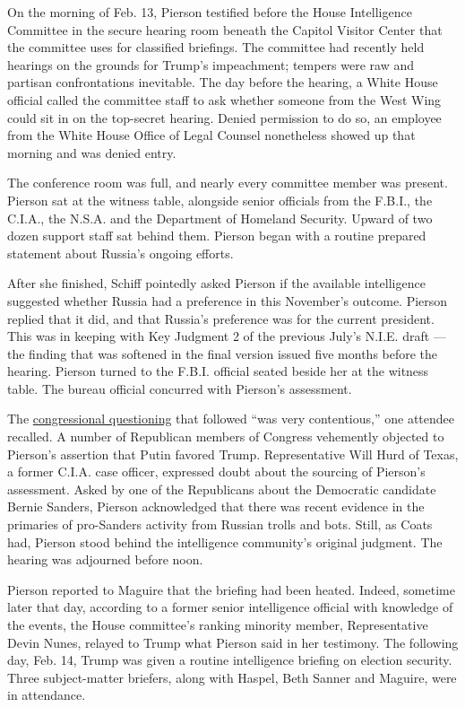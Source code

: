 On the morning of Feb. 13, Pierson testified before the House
Intelligence Committee in the secure hearing room beneath the Capitol
Visitor Center that the committee uses for classified briefings. The
committee had recently held hearings on the grounds for Trump's
impeachment; tempers were raw and partisan confrontations inevitable.
The day before the hearing, a White House official called the committee
staff to ask whether someone from the West Wing could sit in on the
top-secret hearing. Denied permission to do so, an employee from the
White House Office of Legal Counsel nonetheless showed up that morning
and was denied entry.

The conference room was full, and nearly every committee member was
present. Pierson sat at the witness table, alongside senior officials
from the F.B.I., the C.I.A., the N.S.A. and the Department of Homeland
Security. Upward of two dozen support staff sat behind them. Pierson
began with a routine prepared statement about Russia's ongoing efforts.

After she finished, Schiff pointedly asked Pierson if the available
intelligence suggested whether Russia had a preference in this
November's outcome. Pierson replied that it did, and that Russia's
preference was for the current president. This was in keeping with Key
Judgment 2 of the previous July's N.I.E. draft --- the finding that was
softened in the final version issued five months before the hearing.
Pierson turned to the F.B.I. official seated beside her at the witness
table. The bureau official concurred with Pierson's assessment.

The
\href{https://www.nytimes.com/2020/02/20/us/politics/russian-interference-trump-democrats.html}{congressional
questioning} that followed ``was very contentious,'' one attendee
recalled. A number of Republican members of Congress vehemently objected
to Pierson's assertion that Putin favored Trump. Representative Will
Hurd of Texas, a former C.I.A. case officer, expressed doubt about the
sourcing of Pierson's assessment. Asked by one of the Republicans about
the Democratic candidate Bernie Sanders, Pierson acknowledged that there
was recent evidence in the primaries of pro-Sanders activity from
Russian trolls and bots. Still, as Coats had, Pierson stood behind the
intelligence community's original judgment. The hearing was adjourned
before noon.

Pierson reported to Maguire that the briefing had been heated. Indeed,
sometime later that day, according to a former senior intelligence
official with knowledge of the events, the House committee's ranking
minority member, Representative Devin Nunes, relayed to Trump what
Pierson said in her testimony. The following day, Feb. 14, Trump was
given a routine intelligence briefing on election security. Three
subject-matter briefers, along with Haspel, Beth Sanner and Maguire,
were in attendance.


